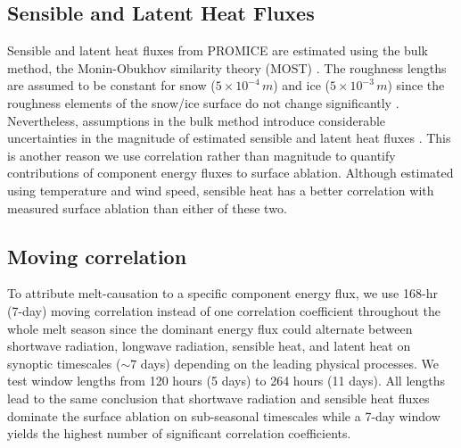 \documentclass[draft]{agujournal2019}
\begin{document}
\subsection{Sensible and Latent Heat Fluxes}
Sensible and latent heat fluxes 
from PROMICE are estimated using the bulk method, 
the Monin-Obukhov similarity theory (MOST) \cite{VanAs2005, VanAs2011a}. 
The roughness lengths are assumed to be constant 
for snow ($5 \times 10^{-4} \, m$) 
and ice ($5 \times 10^{-3} \, m$) \cite{Fausto2016a} 
since the roughness elements of the snow/ice surface 
do not change significantly \cite{VanAs2005}. 
Nevertheless, assumptions in the bulk method 
introduce considerable uncertainties in the magnitude of 
estimated sensible and latent heat fluxes \cite{VandenBroeke2009a}. 
This is another reason we use correlation rather than 
magnitude to quantify contributions of 
component energy fluxes to surface ablation. 
Although estimated using temperature and wind speed, 
sensible heat has a better correlation with 
measured surface ablation than either of these two. 

\subsection{Moving correlation}
To attribute melt-causation to a specific component energy flux, 
we use 168-hr (7-day) moving correlation 
instead of one correlation coefficient throughout 
the whole melt season 
since the dominant energy flux could alternate between 
shortwave radiation, longwave radiation, sensible heat, 
and latent heat on synoptic timescales ($\sim 7$ days) 
depending on the leading physical processes. 
We test window lengths from 120 hours (5 days) to 264 hours (11 days). 
All lengths lead to the same conclusion 
that shortwave radiation and sensible heat fluxes 
dominate the surface ablation on sub-seasonal timescales 
while a 7-day window yields the highest number of 
significant correlation coefficients. 
\end{document}
